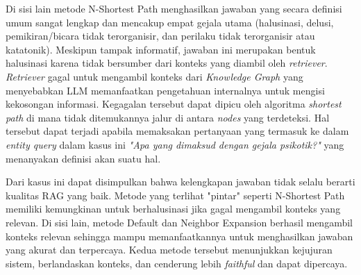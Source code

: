 Di sisi lain metode N-Shortest Path menghasilkan jawaban yang secara definisi umum sangat lengkap dan mencakup empat gejala utama (halusinasi, delusi, pemikiran/bicara tidak terorganisir, dan perilaku tidak terorganisir atau katatonik).
Meskipun tampak informatif, jawaban ini merupakan bentuk halusinasi karena tidak bersumber dari konteks yang diambil oleh \textit{retriever}.
\textit{Retriever} gagal untuk mengambil konteks dari \textit{Knowledge Graph} yang menyebabkan LLM memanfaatkan pengetahuan internalnya untuk mengisi kekosongan informasi.
Kegagalan tersebut dapat dipicu oleh algoritma \textit{shortest path} di mana tidak ditemukannya jalur di antara \textit{nodes} yang terdeteksi.
Hal tersebut dapat terjadi apabila memaksakan pertanyaan yang termasuk ke dalam \textit{entity query} dalam kasus ini \textit{"Apa yang dimaksud dengan gejala psikotik?"} yang menanyakan definisi akan suatu hal.

Dari kasus ini dapat disimpulkan bahwa kelengkapan jawaban tidak selalu berarti kualitas RAG yang baik.
Metode yang terlihat "pintar" seperti N-Shortest Path memiliki kemungkinan untuk berhalusinasi jika gagal mengambil konteks yang relevan.
Di sisi lain, metode Default dan Neighbor Expansion berhasil mengambil konteks relevan sehingga mampu memanfaatkannya untuk menghasilkan jawaban yang akurat dan terpercaya.
Kedua metode tersebut menunjukkan kejujuran sistem, berlandaskan konteks, dan cenderung lebih \textit{faithful} dan dapat dipercaya.







